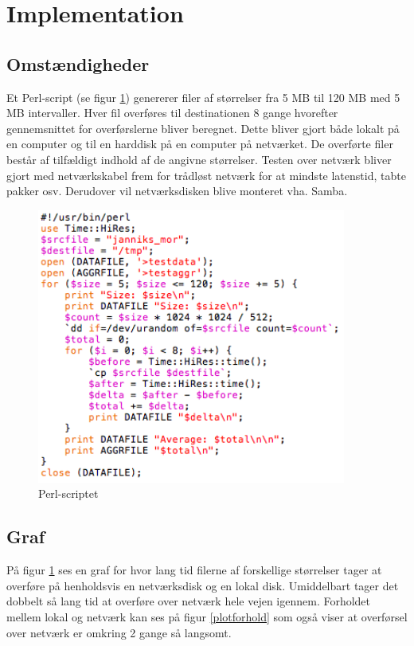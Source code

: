 \documentclass{article}
\begin{document}
\section{Implementation}

\subsection{Omstændigheder}

Et Perl-script (se figur \ref{ploto}) genererer filer af størrelser fra 5 MB til 120 MB med 5 MB intervaller. Hver fil overføres til destinationen 8 gange hvorefter gennemsnittet for overførslerne bliver beregnet. Dette bliver gjort både lokalt på en computer og til en harddisk på en computer på netværket. De overførte filer består af tilfældigt indhold af de angivne størrelser. Testen over netværk bliver gjort med netværkskabel frem for trådløst netværk for at mindste latenstid, tabte pakker osv. Derudover vil netværksdisken blive monteret vha. Samba.

\begin{figure}
	\includegraphics[width=4in]{kode.png}
	\caption{Perl-scriptet}
	\label{ploto}
\end{figure}

\subsection{Graf}
På figur \ref{ploto} ses en graf for hvor lang tid filerne af forskellige størrelser tager at overføre på henholdsvis en netværksdisk og en lokal disk. Umiddelbart tager det dobbelt så lang tid at overføre over netværk hele vejen igennem. Forholdet mellem lokal og netværk kan ses på figur \ref{plotforhold} som også viser at overførsel over netværk er omkring 2 gange så langsomt.
\end{document}
